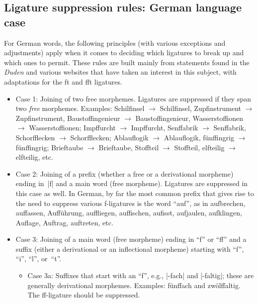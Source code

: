 \documentclass[11pt]{article}
\begin{document}
\subsection{Ligature suppression rules: German language case}

For German words, the following principles (with various exceptions and adjustments) apply when it comes to deciding which ligatures to break up and which ones to permit. These rules are built mainly from statements found in the \emph{Duden} and various websites that have taken an interest in this subject, with adaptations for the ft and fft ligatures.
\begin{itemize}
\item Case 1: Joining of two free morphemes. Ligatures are suppressed if they span two \emph{free} morphemes. Examples: Schil\mbox{fi}nsel $\to$ Schilfinsel, Zup\mbox{fi}nstrument $\to$ Zupfinstrument, Bausto\mbox{ffi}ngenieur $\to$ Baustoffingenieur, Wassersto\mbox{ffi}onen $\to$ Wasserstoffionen; Imp\mbox{ff}urcht $\to$ Impffurcht, Sen\mbox{ff}abrik $\to$ Senffabrik, Schor\mbox{ffl}ecken $\to$ Schorfflecken; Ablau\mbox{fl}ogik $\to$ Ablauflogik,  fün\mbox{ffi}ngrig $\to$ fünf\mbox{fi}ngrig; Brie\mbox{ft}aube $\to$ Brieftaube, Sto\mbox{fft}eil $\to$ Stoffteil, el\mbox{ft}eilig $\to$ elfteilig, etc.


\item Case 2: Joining of a prefix (whether a free or a derivational morpheme) ending in~|f| and a main word (free morpheme). Ligatures are suppressed in this case as well. In German, by far the most common prefix that gives rise to the need to suppress various f-ligatures is the word \enquote{auf}, as in aufbrechen, auffassen, Aufführung, auffliegen, auffischen, auf\breaklig iss\breaklig t, aufjaulen, aufklingen, Auflage, Auftrag, auftreten, etc.

\item Case 3: Joining of a main word (free morpheme) ending in \enquote{f} or \enquote{ff} and a suffix (either a derivational or an inflectional morpheme) starting with \enquote{f}, \enquote{i}, \enquote{l}, or~\enquote{t}.

\begin{itemize}
\item Case 3a: Suffixes that start with an \enquote{f}, e.g., |-fach| and |-faltig|; these are generally derivational morphemes. Examples: fünffach and zwölffaltig. The ff-ligature should be suppressed. 


\end{itemize}
\end{itemize}
\end{document}
